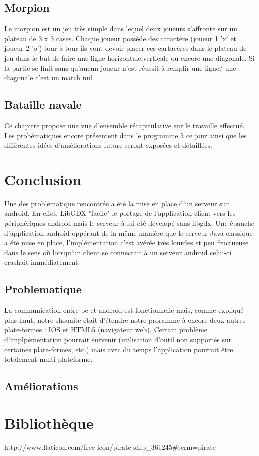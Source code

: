 \documentclass{report}
\begin{document}
\section{Morpion}
Le morpion est un jeu très simple dans lequel deux joueurs s'affronte sur un plateau de 3 x 3 cases. Chaque joueur possède des caractère (joueur 1 'x' et joueur 2 'o')
tour à tour ils vont devoir placer ces cartacères dans le plateau de jeu dans le but de faire une ligne horizontale,verticale ou encore une diagonale.
Si la partie se finit sans qu'aucun joueur n'est réussit à remplir une ligne/ une diagonale c'est un match nul.

\section{Bataille navale}
Ce chapitre propose une vue d'ensemble récapitulative sur le travaille effectué. Les probématiques encore présentent dans le programme à ce jour ainsi que les
différentes idées d'améliorations future seront exposées et détaillées.

\chapter{Conclusion}
Une des problématique rencontrée a été la mise en place d'un serveur sur android. En effet, LibGDX "facile" le portage de l'application client vers les
périphériques android mais le serveur à lui été dévelopé sans libgdx. Une ébauche d'application android oppérant de la même manière que le serveur Java classique a
été mise en place, l'implémentation c'est avérée très lourdes et peu fructueuse dans le sens où lorsqu'un client se connectait à un serveur android celui-ci crashait
immédiatement.

\section{Problematique}
La communication entre pc et android est fonctionnelle mais, comme expliqué plus haut, notre shouaite était d'étendre notre proramme à encore deux autres
plate-formes : IOS et HTML5 (navigateur web). Certain problème d'implpémentation pourrait survenir (utilisation d'outil non supportés sur certaines plate-formes, etc.)
mais avec du temps l'application pourrait être totalement multi-plateforme.

\section{Améliorations}

\chapter{Bibliothèque}
http://www.flaticon.com/free-icon/pirate-ship_361245#term=pirate%
\end{document}
